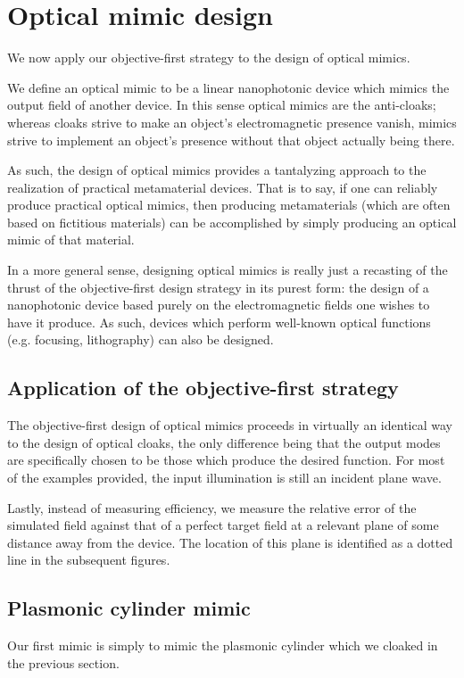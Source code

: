 \section{Optical mimic design}
We now apply our objective-first strategy to the design of optical mimics.

We define an optical mimic to be a linear nanophotonic device which 
    mimics the output field of another device.
In this sense optical mimics are the anti-cloaks;
    whereas cloaks strive to make an object's electromagnetic presence vanish,
    mimics strive to implement an object's presence without that 
    object actually being there.

As such, the design of optical mimics provides a tantalyzing approach
    to the realization of practical metamaterial devices.
That is to say, if one can reliably produce practical optical mimics,
    then producing metamaterials (which are often based on fictitious materials)
    can be accomplished by simply producing an optical mimic of that material.

In a more general sense, 
    designing optical mimics is really just a recasting of the thrust of 
    the objective-first design strategy in its purest form:
    the design of a nanophotonic device based purely 
    on the electromagnetic fields one wishes to have it produce.
As such, devices which perform well-known optical functions
    (e.g. focusing, lithography) can also be designed.

\subsection{Application of the objective-first strategy}
The objective-first design of optical mimics proceeds in virtually
    an identical way to the design of optical cloaks,
    the only difference being that the output modes are 
    specifically chosen to be those which produce the desired function.
For most of the examples provided, the input illumination is still an incident plane wave.

Lastly, instead of measuring efficiency, 
    we measure the relative error of the simulated field
    against that of a perfect target field
    at a relevant plane of some distance away from the device.
The location of this plane is identified as a dotted line in the subsequent figures.

\subsection{Plasmonic cylinder mimic}
Our first mimic is simply to mimic the plasmonic cylinder 
    which we cloaked in the previous section.

